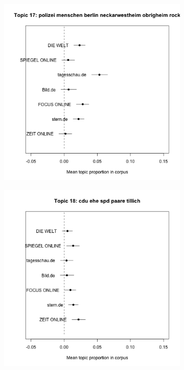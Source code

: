 \documentclass[12pt,a4paper,notitlepage]{article}
\begin{document}
\begin{figure}[H]
\begin{center}
\begin{subfigure}[normla]{0.2\textwidth}
		\end{subfigure}
		\begin{subfigure}[normla]{0.2\textwidth}
			\includegraphics[width=\textwidth]{../figs/estimate_effect17.png}
		\end{subfigure}
		\begin{subfigure}[normla]{0.2\textwidth}
			\includegraphics[width=\textwidth]{../figs/estimate_effect18.png}

\end{subfigure}
\end{center}
\end{figure}
\end{document}
